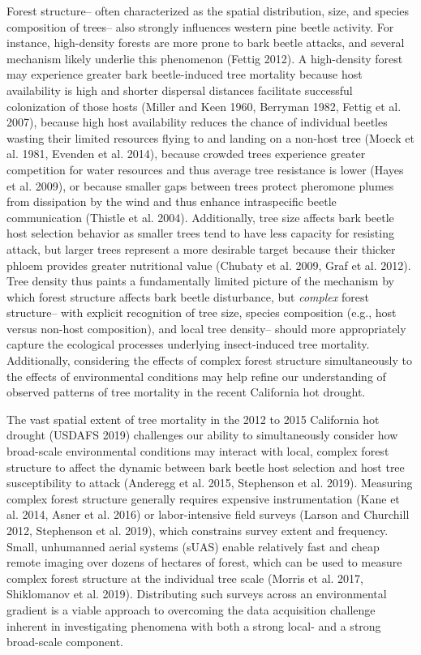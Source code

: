 \documentclass[]{article}
\begin{document}
Forest structure-- often characterized as the spatial distribution,
size, and species composition of trees-- also strongly influences
western pine beetle activity. For instance, high-density forests are
more prone to bark beetle attacks, and several mechanism likely underlie
this phenomenon (Fettig 2012). A high-density forest may experience
greater bark beetle-induced tree mortality because host availability is
high and shorter dispersal distances facilitate successful colonization
of those hosts (Miller and Keen 1960, Berryman 1982, Fettig et al.
2007), because high host availability reduces the chance of individual
beetles wasting their limited resources flying to and landing on a
non-host tree (Moeck et al. 1981, Evenden et al. 2014), because crowded
trees experience greater competition for water resources and thus
average tree resistance is lower (Hayes et al. 2009), or because smaller
gaps between trees protect pheromone plumes from dissipation by the wind
and thus enhance intraspecific beetle communication (Thistle et al.
2004). Additionally, tree size affects bark beetle host selection
behavior as smaller trees tend to have less capacity for resisting
attack, but larger trees represent a more desirable target because their
thicker phloem provides greater nutritional value (Chubaty et al. 2009,
Graf et al. 2012). Tree density thus paints a fundamentally limited
picture of the mechanism by which forest structure affects bark beetle
disturbance, but \emph{complex} forest structure-- with explicit
recognition of tree size, species composition (e.g., host versus
non-host composition), and local tree density-- should more
appropriately capture the ecological processes underlying insect-induced
tree mortality. Additionally, considering the effects of complex forest
structure simultaneously to the effects of environmental conditions may
help refine our understanding of observed patterns of tree mortality in
the recent California hot drought.

The vast spatial extent of tree mortality in the 2012 to 2015 California
hot drought (USDAFS 2019) challenges our ability to simultaneously
consider how broad-scale environmental conditions may interact with
local, complex forest structure to affect the dynamic between bark
beetle host selection and host tree susceptibility to attack (Anderegg
et al. 2015, Stephenson et al. 2019). Measuring complex forest structure
generally requires expensive instrumentation (Kane et al. 2014, Asner et
al. 2016) or labor-intensive field surveys (Larson and Churchill 2012,
Stephenson et al. 2019), which constrains survey extent and frequency.
Small, unhumanned aerial systems (sUAS) enable relatively fast and cheap
remote imaging over dozens of hectares of forest, which can be used to
measure complex forest structure at the individual tree scale (Morris et
al. 2017, Shiklomanov et al. 2019). Distributing such surveys across an
environmental gradient is a viable approach to overcoming the data
acquisition challenge inherent in investigating phenomena with both a
strong local- and a strong broad-scale component.
\end{document}

